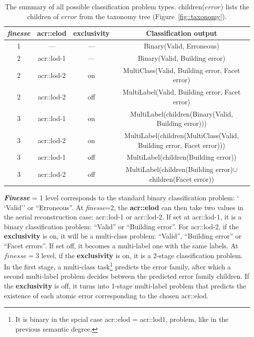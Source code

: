         \begin{table}
            \begin{tabular}{c c c c}
                \toprule
                \textbf{\textit{finesse}} & \textbf{\gls{acr::elod}} & \textbf{exclusivity} & \textbf{Classification output}\\
                \midrule
                \scriptsize
                1 & --- & --- & Binary(Valid, Erroneous)\\
                2 & \gls{acr::lod}-1 & --- & Binary(Valid, Building error)\\
                2 & \gls{acr::lod}-2 & on & MultiClass(Valid, Building error, Facet error)\\
                2 & \gls{acr::lod}-2 & off & MultiLabel(Valid, Building error, Facet error)\\
                3 & \gls{acr::lod}-1 & on & MultiLabel(children(Binary(Valid, Building error)))\\
                3 & \gls{acr::lod}-2 & on & MultiLabel(children(MultiClass(Valid, Building error, Facet error)))\\
                3 & \gls{acr::lod}-1 & off & MultiLabel(children(Building error))\\
                3 & \gls{acr::lod}-2 & off & MultiLabel(children(Building error)$\cup$ children(Facet error))\\
                \bottomrule
            \end{tabular}
            \caption{
                \label{tab::problems} The summary of all possible classification problem types.
                children($error$) lists the children of $error$ from the taxonomy tree (Figure~\ref{fig::taxonomy}).
            }
        \end{table}
            
        \textbf{\textit{Finesse}} = 1 level corresponds to the standard binary classification problem: ` `Valid'' or ``Erroneous''.
        At \textit{finesse}=2, the \textbf{\gls{acr::elod}} can then take two values in the aerial reconstruction case: \gls{acr::lod}-1 or \gls{acr::lod}-2.
        If set at \gls{acr::lod}-1, it is a binary classification problem: ``Valid'' or ``Building error''.
        For \gls{acr::lod}-2, if the \textbf{exclusivity} is on, it will be a multi-class problem: ``Valid'', ``Building error'' or ``Facet errors''.
        If set off, it becomes a multi-label one with the same labels.
        At $\textit{finesse}=3$ level, if the \textbf{exclusivity} is on, it is a 2-stage classification problem.
        In the first stage, a multi-class task\footnote{It is binary in the spcial case \gls{acr::elod} = \gls{acr::lod}1, problem, like in the previous semantic degree.}
        predicts the error family, after which a second multi-label problem decides between the predicted error family children.
        If the \textbf{exclusivity} is off, it turns into  1-stage multi-label problem that predicts the existence of each atomic error corresponding to the chosen \gls{acr::elod}.

